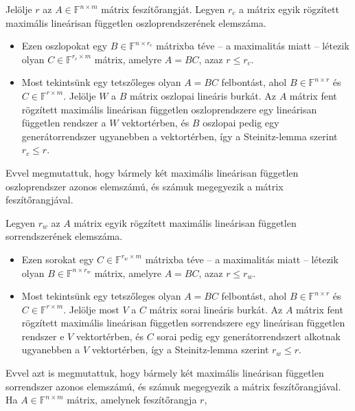 \documentclass[9pt, a4paper, showtrims]{memoir}
\makeatletter
\renewenvironment{proof}[1][\proofname]
    {\par\pushQED{\qed}%
    \normalfont \topsep6\p@\@plus6\p@\relax
    \trivlist
    \item[\hskip\labelsep
        \itshape
    #1\@addpunct{:}]\ignorespaces}
    {\popQED\endtrivlist\@endpefalse}
\theoremstyle{plain}
\theoremstyle{remark}
\theoremstyle{definition}
\makeatother
\begin{document}
\begin{proof}
	Jelölje $r$ az $A\in\mathbb{F}^{n\times m}$ mátrix feszítőrangját.
	Legyen $r_c$ a mátrix egyik rögzített maximális lineárisan független oszloprendszerének elemszáma.
	\begin{itemize}
		\item
		      Ezen oszlopokat egy $B\in\mathbb{F}^{n\times r_c}$ mátrixba téve
		      -- a maximalitás miatt -- létezik olyan $C\in\mathbb{F}^{r_c\times m}$ mátrix,
		      amelyre $A=BC$, azaz $r\leq r_c$.
		\item
		      Most tekintsünk egy tetszőleges olyan
		      \(
		      A=BC
		      \)
		      felbontást,
		      ahol $B\in\mathbb{F}^{n\times r}$ és $C\in\mathbb{F}^{r\times m}$.
		      Jelölje $W$ a $B$ mátrix oszlopai lineáris burkát.
		      Az $A$ mátrix fent rögzített maximális lineárisan független oszloprendszere egy lineárisan független rendszer a
		      $W$ vektortérben,
		      és $B$ oszlopai pedig egy generátorrendszer ugyanebben a vektortérben,
		      így a Steinitz-lemma  szerint $r_c\leq r$.
	\end{itemize}
	Evvel megmutattuk, hogy bármely két maximális lineárisan független oszloprendszer azonos elemszámú, és számuk megegyezik a mátrix feszítőrangjával.


	Legyen $r_w$ az $A$ mátrix egyik rögzített maximális lineárisan független sorrendszerének elemszáma.
	\begin{itemize}
		\item
		      Ezen sorokat egy $C\in\mathbb{F}^{r_w\times m}$ mátrixba téve
		      -- a maximalitás miatt -- létezik olyan $B\in\mathbb{F}^{n\times r_w}$ mátrix,
		      amelyre $A=BC$, azaz $r\leq r_w$.
		\item
		      Most tekintsünk egy tetszőleges olyan
		      \(
		      A=BC
		      \)
		      felbontást,
		      ahol $B\in\mathbb{F}^{n\times r}$ és $C\in\mathbb{F}^{r\times m}$.
		      Jelölje most $V$ a $C$ mátrix sorai lineáris burkát.
		      Az $A$ mátrix fent rögzített maximális lineárisan független sorrendszere egy lineárisan független rendszer e
		      $V$ vektortérben,
		      és $C$ sorai pedig egy generátorrendszert alkotnak ugyanebben a $V$ vektortérben,
		      így a Steinitz-lemma szerint $r_w\leq r$.
	\end{itemize}
	Evvel azt is megmutattuk,
	hogy bármely két maximális lineárisan független sorrendszer azonos elemszámú,
	és számuk megegyezik a mátrix feszítőrangjával.
\end{proof}
Ha $A\in\mathbb{F}^{n\times m}$ mátrix, amelynek feszítőrangja $r$,
\end{document}
